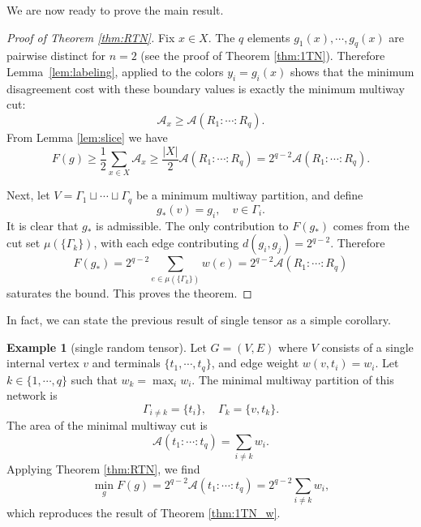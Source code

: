\documentclass[11pt,oneside,letterpaper]{article}
\numberwithin{equation}{section}
\theoremstyle{definition}
\newtheorem{example}[theorem]{Example}
\theoremstyle{remark}
\begin{document}
We are now ready to prove the main result.

\begin{proof}[Proof of Theorem \ref{thm:RTN}]
  Fix $x\in X$. The $q$ elements $g_1(x),\cdots,g_q(x)$ are pairwise distinct for $n=2$ (see the proof of Theorem \ref{thm:1TN}).
  Therefore Lemma~\ref{lem:labeling}, applied to the colors $y_i=g_i(x)$ shows that the minimum disagreement cost with these boundary values is exactly the minimum multiway cut:
  \begin{equation}
    \mathcal{A}_x \ge \mathcal{A}(R_1:\cdots:R_q).
  \end{equation}
  From Lemma \ref{lem:slice} we have
  \begin{equation}
    F(g) \ge \frac{1}{2}\sum_{x\in X} \mathcal{A}_x \ge \frac{|X|}{2} \mathcal{A}(R_1:\cdots:R_q) = 2^{q-2} \mathcal{A}(R_1:\cdots:R_q).
  \end{equation}

  Next, let $V=\Gamma_1\sqcup\cdots \sqcup \Gamma_q$ be a minimum multiway partition, and define
  \begin{equation}
    g_*(v)=g_i,\quad v\in \Gamma_i.
  \end{equation}
  It is clear that $g_*$ is admissible. The only contribution to $F(g_*)$ comes from the cut set $\mu(\{\Gamma_k\})$, with each edge contributing $d(g_i,g_j)=2^{q-2}$. Therefore
  \begin{equation}
    F(g_*) = 2^{q-2} \sum_{e\in \mu(\{\Gamma_k\})} w(e) = 2^{q-2} \mathcal{A} (R_1:\cdots:R_q)
  \end{equation}
  saturates the bound. This proves the theorem.
\end{proof}


In fact, we can state the previous result of single tensor as a simple corollary.
\begin{example}[single random tensor]
  Let $G=(V,E)$ where $V$ consists of a single internal vertex $v$ and terminals $\{t_1,\cdots,t_q\}$, and edge weight $w(v,t_i) = w_i$.
  Let $k\in\{1,\cdots,q\}$ such that $w_k = \max_i w_i$.   The minimal multiway partition of this network is
  \begin{equation}
    \Gamma_{i\ne k} = \{t_i\}, \quad \Gamma_k = \{v,t_k\}.
  \end{equation}
  The area of the minimal multiway cut is
  \begin{equation}
    \mathcal{A}(t_1:\cdots:t_q) = \sum_{i\ne k} w_i.
  \end{equation}
  Applying Theorem \ref{thm:RTN}, we find
  \begin{equation}
    \min_g F(g) = 2^{q-2}\mathcal{A}(t_1:\cdots:t_q) = 2^{q-2}\sum_{i\ne k} w_i,
  \end{equation}
  which reproduces the result of Theorem \ref{thm:1TN_w}.
\end{example}
\end{document}
